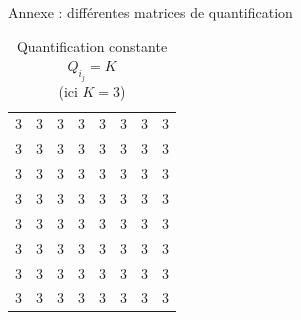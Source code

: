 \documentclass[xcolor=dvipsnames]{beamer}
\begin{document}
\begin{frame} {Annexe : différentes matrices de quantification}
    \begin{minipage}{0.3\textwidth}
        \centering
        \begin{table}
        \tiny 
        \centering
        \renewcommand{\arraystretch}{1.1} %

        \setlength{\tabcolsep}{2pt} %
            \begin{tabular}{cccccccc}
                3 & 3 & 3 & 3 & 3 & 3 & 3 & 3\\
                3 & 3 & 3 & 3 & 3 & 3 & 3 & 3\\
                3 & 3 & 3 & 3 & 3 & 3 & 3 & 3\\
                3 & 3 & 3 & 3 & 3 & 3 & 3 & 3\\
                3 & 3 & 3 & 3 & 3 & 3 & 3 & 3\\
                3 & 3 & 3 & 3 & 3 & 3 & 3 & 3\\
                3 & 3 & 3 & 3 & 3 & 3 & 3 & 3\\
                3 & 3 & 3 & 3 & 3 & 3 & 3 & 3\\
            \end{tabular}
            \caption{\centering Quantification constante $Q_i_j = K$ \\ (ici $K = 3$)}
        \end{table}
    \end{minipage}
    \hfill
    \begin{minipage}{0.3\textwidth}
        \centering
        \begin{table}
            \tiny 
            \renewcommand{\arraystretch}{1.1} %
            \centering
            \setlength{\tabcolsep}{2pt} %
    

\end{table}
\end{minipage}
\end{frame}
\end{document}
